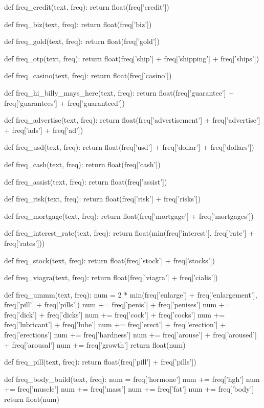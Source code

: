 \documentclass[11pt]{article}
\begin{document}
\begin{python}
def freq_credit(text, freq):
    return float(freq['credit'])

def freq_biz(text, freq):
    return float(freq['biz'])

def freq_gold(text, freq):
    return float(freq['gold'])

def freq_otp(text, freq):
    return float(freq['ship'] + freq['shipping'] + freq['ships'])

def freq_casino(text, freq):
    return float(freq['casino'])

def freq_hi_billy_mays_here(text, freq):
    return float(freq['guarantee'] + freq['guarantees'] + freq['guaranteed'])

def freq_advertise(text, freq):
    return float(freq['advertisement'] + freq['advertise'] + freq['ads'] + freq['ad'])

def freq_usd(text, freq):
    return float(freq['usd'] + freq['dollar'] + freq['dollars'])

def freq_cash(text, freq):
    return float(freq['cash'])

def freq_assist(text, freq):
    return float(freq['assist'])

def freq_risk(text, freq):
    return float(freq['risk'] + freq['risks'])

def freq_mortgage(text, freq):
    return float(freq['mortgage'] + freq['mortgages'])

def freq_interest_rate(text, freq):
    return float(min(freq['interest'], freq['rate'] + freq['rates']))

def freq_stock(text, freq):
    return float(freq['stock'] + freq['stocks'])

def freq_viagra(text, freq):
    return float(freq['viagra'] + freq['cialis'])

def freq_ummm(text, freq):
    num = 2 * min(freq['enlarge'] + freq['enlargement'], freq['pill'] + freq['pills'])
    num += freq['penis'] + freq['penises']
    num += freq['dick'] + freq['dicks']
    num += freq['cock'] + freq['cocks']
    num += freq['lubricant'] + freq['lube']
    num += freq['erect'] + freq['erection'] + freq['erections']
    num += freq['hardness']
    num += freq['arouse'] + freq['aroused'] + freq['arousal']
    num += freq['growth']
    return float(num)

def freq_pill(text, freq):
    return float(freq['pill'] + freq['pills'])

def freq_body_build(text, freq):
    num = freq['hormone']
    num += freq['hgh']
    num += freq['muscle']
    num += freq['mass']
    num += freq['fat']
    num += freq['body']
    return float(num)


\end{python}
\end{document}
